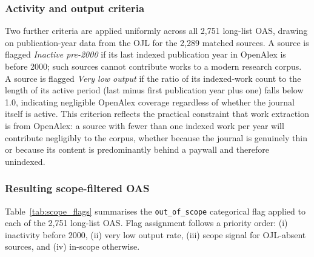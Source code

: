 \subsubsection*{Activity and output criteria}

Two further criteria are applied uniformly across all 2{,}751 long-list OAS,
drawing on publication-year data from the OJL for the 2{,}289 matched sources.
A source is flagged \textit{Inactive pre-2000} if its last indexed publication
year in OpenAlex is before 2000; such sources cannot contribute works to a
modern research corpus.
A source is flagged \textit{Very low output} if the ratio of its indexed-work
count to the length of its active period (last minus first publication year plus
one) falls below 1.0, indicating negligible OpenAlex coverage regardless of
whether the journal itself is active.
This criterion reflects the practical constraint that work extraction is from
OpenAlex: a source with fewer than one indexed work per year will contribute
negligibly to the corpus, whether because the journal is genuinely thin or because
its content is predominantly behind a paywall and therefore unindexed.

\subsubsection*{Resulting scope-filtered OAS}

Table~\ref{tab:scope_flags} summarises the \texttt{out\_of\_scope} categorical flag
applied to each of the 2{,}751 long-list OAS.
Flag assignment follows a priority order:
(i) inactivity before 2000,
(ii) very low output rate,
(iii) scope signal for OJL-absent sources, and
(iv) in-scope otherwise.

